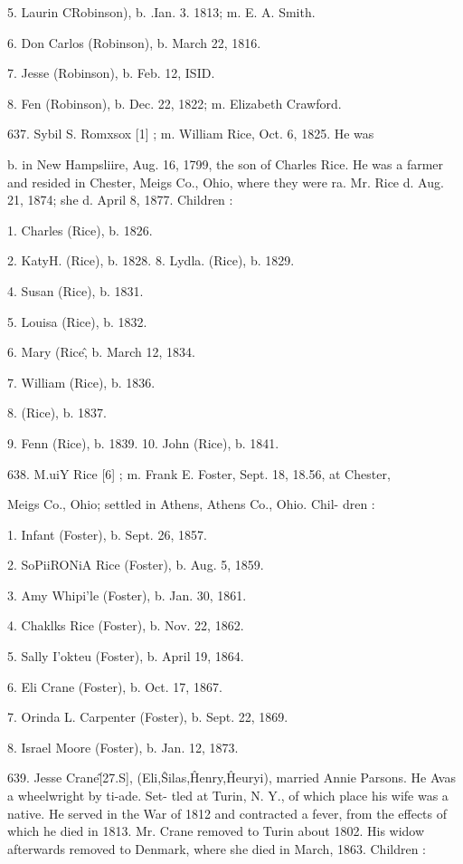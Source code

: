 5. Laurin CRobinson), b. .Ian. 3. 1813; m. E. A. Smith. 

6. Don Carlos (Robinson), b. March 22, 1816. 

7. Jesse (Robinson), b. Feb. 12, ISID. 

8. Fen (Robinson), b. Dec. 22, 1822; m. Elizabeth Crawford. 

637. Sybil S. Romxsox [1] ; m. William Rice, Oct. 6, 1825. He was 

b. in New Hampsliire, Aug. 16, 1799, the son of Charles Rice. 
He was a farmer and resided in Chester, Meigs Co., Ohio, 
where they were ra. Mr. Rice d. Aug. 21, 1874; she d. April 
8, 1877. Children : 

1. Charles (Rice), b. 1826. 

2. KatyH. (Rice), b. 1828. 
8. Lydla. (Rice), b. 1829. 

4. Susan (Rice), b. 1831. 

5. Louisa (Rice), b. 1832. 

6. Mary (Rice\^, b. March 12, 1834. 

7. William (Rice), b. 1836. 

8. (Rice), b. 1837. 

9. Fenn (Rice), b. 1839. 
10. John (Rice), b. 1841. 

638. M.uiY Rice [6] ; m. Frank E. Foster, Sept. 18, 18.56, at Chester, 

Meigs Co., Ohio; settled in Athens, Athens Co., Ohio. Chil- 
dren : 

1. Infant (Foster), b. Sept. 26, 1857. 

2. SoPiiRONiA Rice (Foster), b. Aug. 5, 1859. 

3. Amy Whipi'le (Foster), b. Jan. 30, 1861. 

4. Chaklks Rice (Foster), b. Nov. 22, 1862. 

5. Sally I'okteu (Foster), b. April 19, 1864. 

6. Eli Crane (Foster), b. Oct. 17, 1867. 

7. Orinda L. Carpenter (Foster), b. Sept. 22, 1869. 

8. Israel Moore (Foster), b. Jan. 12, 1873. 

639. Jesse Crane\^ [27.S], (Eli,\^ Silas,\^ Henry,\^ Heuryi), 
married Annie Parsons. He Avas a wheelwright by ti-ade. Set- 
tled at Turin, N. Y., of which place his wife was a native. He 
served in the War of 1812 and contracted a fever, from the 
effects of which he died in 1813. Mr. Crane removed to Turin 
about 1802. His widow afterwards removed to Denmark, where 
she died in March, 1863. Children : 

